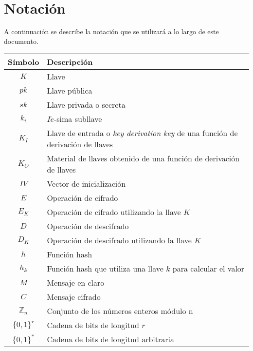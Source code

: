 %
%

\newpage
{}
{}
\section*{Notación}

A continuación se describe la notación que se utilizará a lo largo de
este documento.

\begin{table}[H]
  \begin{center}
    \begin{tabular}{c|l}
      \hline
      Símbolo & Descripción \\
      \hline
      $K$ & Llave \\
      \hline
      $pk$ & Llave pública \\
      \hline
      $sk$ & Llave privada o secreta \\
      \hline
      $k_i$ & $I\acute{e}$-sima subllave \\
      \hline
      $K_I$ & Llave de entrada o \textit{key derivation key} de una función
      de derivación de llaves \\
      \hline
      $K_O$ & Material de llaves obtenido de una función de derivación de llaves \\
      \hline
      $IV$ & Vector de inicialización \\
      \hline
      $E$ & Operación de cifrado \\
      \hline
      $E_K$ & Operación de cifrado utilizando la llave $K$ \\
      \hline
      $D$ & Operación de descifrado \\
      \hline
      $D_K$ & Operación de descifrado utilizando la llave $K$ \\
      \hline
      $h$ & Función hash \\
      \hline
      $h_k$ & Función hash que utiliza una llave $k$ para calcular el valor\\
      \hline
      $M$ & Mensaje en claro\\
      \hline
      $C$ & Mensaje cifrado\\
      \hline
      $\mathbb{Z}_n$ & Conjunto de los números enteros módulo n\\
      \hline
      $\{0,1\}^r$ & Cadena de bits de longitud $r$ \\
      \hline
      $\{0,1\}^*$ & Cadena de bits de longitud arbitraria \\

\end{tabular}
\end{center}
\end{table}
